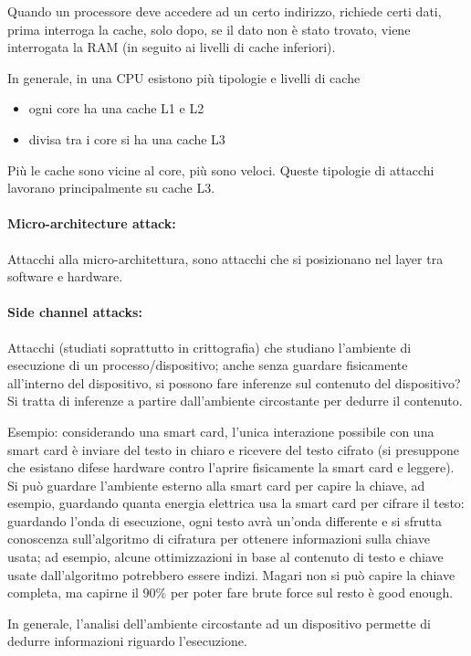 Quando un processore deve accedere ad un certo indirizzo, richiede certi dati, prima interroga la cache, solo dopo, se il dato non è stato trovato, viene interrogata la RAM (in seguito ai livelli di cache inferiori).

In generale, in una CPU esistono più tipologie e livelli di cache 
\begin{itemize}
	\item ogni core ha una cache L1 e L2
	\item divisa tra i core si ha una cache L3
\end{itemize}
Più le cache sono vicine al core, più sono veloci. Queste tipologie di attacchi lavorano principalmente su cache L3. 

\paragraph{Micro-architecture attack:} Attacchi alla micro-architettura, sono attacchi che si posizionano nel layer tra software e hardware. 

\paragraph{Side channel attacks:} Attacchi (studiati soprattutto in crittografia) che studiano l'ambiente di esecuzione di un processo/dispositivo; anche senza guardare fisicamente all'interno del dispositivo, si possono fare inferenze sul contenuto del dispositivo? Si tratta di inferenze a partire dall'ambiente circostante per dedurre il contenuto. 

Esempio: considerando una smart card, l'unica interazione possibile con una smart card è inviare del testo in chiaro e ricevere del testo cifrato (si presuppone che esistano difese hardware contro l'aprire fisicamente la smart card e leggere). Si può guardare l'ambiente esterno alla smart card per capire la chiave, ad esempio, guardando quanta energia elettrica usa la smart card per cifrare il testo: guardando l'onda di esecuzione, ogni testo avrà un'onda differente e si sfrutta conoscenza sull'algoritmo di cifratura per ottenere informazioni sulla chiave usata; ad esempio, alcune ottimizzazioni in base al contenuto di testo e chiave usate dall'algoritmo potrebbero essere indizi. Magari non si può capire la chiave completa, ma capirne il 90\% per poter fare brute force sul resto è good enough.

In generale, l'analisi dell'ambiente circostante ad un dispositivo permette di dedurre informazioni riguardo l'esecuzione.


